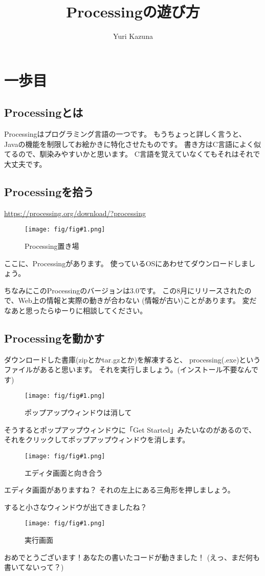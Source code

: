 \documentclass[12pt,titlepage]{ltjsarticle}
\newcommand{\fig}[2]{\begin{figure}[htbp]%
\centering\texttt{[image: fig/fig\#1.png]}%
\caption{#2}\end{figure}}
\begin{document}
\title{Processingの遊び方}
\author{Yuri Kazuna}
\maketitle

\section{一歩目}
\subsection{Processingとは}
Processingはプログラミング言語の一つです。
もうちょっと詳しく言うと、
Javaの機能を制限してお絵かきに特化させたものです。
書き方はC言語によく似てるので、馴染みやすいかと思います。
C言語を覚えていなくてもそれはそれで大丈夫です。

\subsection{Processingを拾う}
\href{https://processing.org/download/?processing}{https://processing.org/download/?processing}

\fig{1-1}{Processing置き場}

ここに、Processingがあります。
使っているOSにあわせてダウンロードしましょう。

ちなみにこのProcessingのバージョンは3.0です。
この8月にリリースされたので、Web上の情報と実際の動きが合わない
(情報が古い)ことがあります。
変だなあと思ったらゆーりに相談してください。

\subsection{Processingを動かす}
ダウンロードした書庫(zipとかtar.gzとか)を解凍すると、
processing(.exe)というファイルがあると思います。
それを実行しましょう。(インストール不要なんです)

\fig{1-2}{ポップアップウィンドウは消して}

そうするとポップアップウィンドウに「Get Started」みたいなのがあるので、
それをクリックしてポップアップウィンドウを消します。

\fig{1-3}{エディタ画面と向き合う}

エディタ画面がありますね？
それの左上にある三角形を押しましょう。

すると小さなウィンドウが出てきましたね？

\fig{1-4}{実行画面}

おめでとうございます！あなたの書いたコードが動きました！
(えっ、まだ何も書いてないって？)
\end{document}
